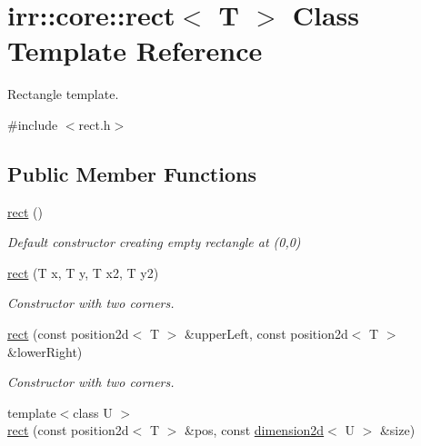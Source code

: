 \hypertarget{classirr_1_1core_1_1rect}{}\section{irr\+:\+:core\+:\+:rect$<$ T $>$ Class Template Reference}
\label{classirr_1_1core_1_1rect}


Rectangle template.  




{\ttfamily \#include $<$rect.\+h$>$}

\subsection*{Public Member Functions}
\begin{DoxyCompactItemize}
\item 
\hyperlink{classirr_1_1core_1_1rect_a04c79e7af6ff14b62e569628c4f83e44}{rect} ()\hypertarget{classirr_1_1core_1_1rect_a04c79e7af6ff14b62e569628c4f83e44}{}\label{classirr_1_1core_1_1rect_a04c79e7af6ff14b62e569628c4f83e44}

\begin{DoxyCompactList}\small\item\em Default constructor creating empty rectangle at (0,0) \end{DoxyCompactList}\item 
\hyperlink{classirr_1_1core_1_1rect_af7d59f53cd24d5f9f587896160ece50a}{rect} (T x, T y, T x2, T y2)\hypertarget{classirr_1_1core_1_1rect_af7d59f53cd24d5f9f587896160ece50a}{}\label{classirr_1_1core_1_1rect_af7d59f53cd24d5f9f587896160ece50a}

\begin{DoxyCompactList}\small\item\em Constructor with two corners. \end{DoxyCompactList}\item 
\hyperlink{classirr_1_1core_1_1rect_a8f207109cebad893de44b01cc67e9e34}{rect} (const position2d$<$ T $>$ \&upper\+Left, const position2d$<$ T $>$ \&lower\+Right)\hypertarget{classirr_1_1core_1_1rect_a8f207109cebad893de44b01cc67e9e34}{}\label{classirr_1_1core_1_1rect_a8f207109cebad893de44b01cc67e9e34}

\begin{DoxyCompactList}\small\item\em Constructor with two corners. \end{DoxyCompactList}\item 
{\footnotesize template$<$class U $>$ }\\\hyperlink{classirr_1_1core_1_1rect_a54526b73a11cf90a4f4ff0c6d1556fcc}{rect} (const position2d$<$ T $>$ \&pos, const \hyperlink{classirr_1_1core_1_1dimension2d}{dimension2d}$<$ U $>$ \&size)\hypertarget{classirr_1_1core_1_1rect_a54526b73a11cf90a4f4ff0c6d1556fcc}{}\label{classirr_1_1core_1_1rect_a54526b73a11cf90a4f4ff0c6d1556fcc}


\end{DoxyCompactItemize}
